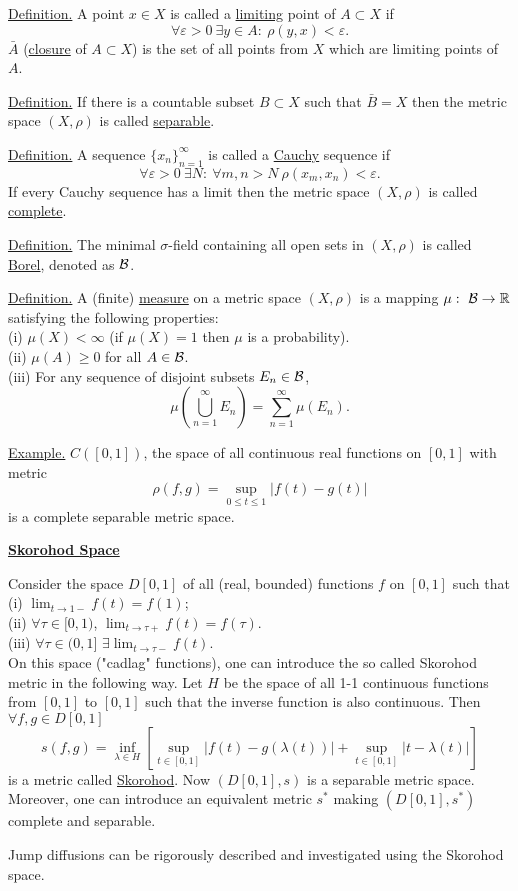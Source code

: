 \documentclass[a4paper,10pt]{article}
\def\RR{\mathbb{R}}
\newcommand{\1}[1]{\mathbf{1}_{\{#1\}}}
\begin{document}
\underline{Definition.} A point $x\in X$ is called a \underline{limiting} point of $A\subset X$ if
$$\forall\varepsilon>0~\exists y\in A:~\rho(y,x)<\varepsilon.$$
$\bar A$ (\underline{closure} of $A\subset X$) is the set of all points from $X$ which are limiting points of $A$.

\underline{Definition.} If there is a countable subset $B\subset X$ such that $\bar B=X$ then the metric space $(X,\rho)$ is called \underline{separable}.

\underline{Definition.} A sequence $\{x_n\}_{n=1}^\infty$ is called a \underline{Cauchy} sequence if
$$\forall\varepsilon>0~\exists N:~ \forall m,n>N~\rho(x_m,x_n)<\varepsilon.$$
If every Cauchy sequence has a limit then the metric space $(X,\rho)$ is called \underline{complete}.

\underline{Definition.} The minimal $\sigma$-field containing all open sets in $(X,\rho)$ is called \underline{Borel}, denoted as $\cal B$.

\underline{Definition.} A (finite) \underline{measure} on a metric space $(X,\rho)$ is a mapping $\mu:~{\cal B}\to\RR$ satisfying the following properties:\\
(i) $\mu(X)<\infty$ (if $\mu(X)=1$ then $\mu$ is a probability).\\
(ii) $\mu(A)\ge 0$ for all $A\in{\cal B}$.\\
(iii) For any sequence of disjoint subsets $E_n\in{\cal B}$,
$$\mu\left(\bigcup_{n=1}^\infty E_n\right)=\sum_{n=1}^\infty \mu(E_n).$$

\underline{Example.} $C([0,1])$, the space of all continuous real functions on $[0,1]$ with metric
$$\rho(f,g)=\sup_{0\le t\le 1}|f(t)-g(t)|$$
is a complete separable metric space.
\vspace{3mm}

\begin{center}\bf\underline{Skorohod Space}\end{center}
\vspace{3mm}

Consider the space $D[0,1]$ of all (real, bounded) functions $f$ on $[0,1]$ such that\\
(i) $\lim_{t\to 1-} f(t)=f(1)$;\\
(ii) $\forall \tau\in[0,1)$, $\lim_{t\to \tau+} f(t)=f(\tau)$.\\
(iii) $\forall \tau\in(0,1]$ $\exists \lim_{t\to\tau-} f(t)$.\\
On this space ("cadlag" functions), one can introduce the so called Skorohod metric in the following way. Let $H$ be the space of all 1-1 continuous functions from $[0,1]$ to $[0,1]$ such that the inverse function is also continuous. Then $\forall f,g\in D[0,1]$
$$s(f,g)=\inf_{\lambda\in H}\left[ \sup_{t\in[0,1]} |f(t)-g(\lambda(t))|+\sup_{t\in[0,1]} |t-\lambda(t)|\right]$$
is a metric called \underline{Skorohod}. Now $(D[0,1],s)$ is a separable metric space. Moreover, one can introduce an equivalent metric $s^*$ making $(D[0,1],s^*)$ complete and separable.

Jump diffusions can be rigorously described and investigated using the Skorohod space.
\end{document}
